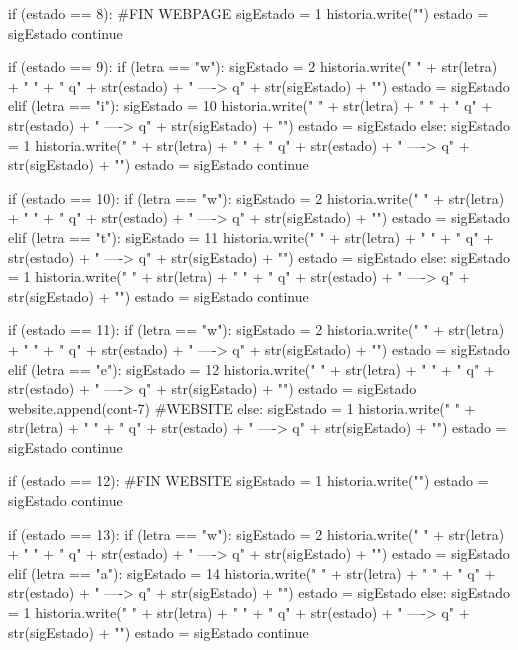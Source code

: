 \documentclass{article}
\begin{document}
\begin{python}
				if (estado == 8): #FIN WEBPAGE                   
					sigEstado = 1
					historia.write("\n")
					estado = sigEstado
				continue
			
				if (estado == 9):
					if (letra == "w"):
						sigEstado = 2
						historia.write(" { " + str(letra) + " } " + "  q" + str(estado) + "  ---->  q" + str(sigEstado) + "\n")
						estado = sigEstado              
					elif (letra == "i"):
						sigEstado = 10
						historia.write(" { " + str(letra) + " } " + "  q" + str(estado) + "  ---->  q" + str(sigEstado) + "\n")
						estado = sigEstado            
					else:
						sigEstado = 1
						historia.write(" { " + str(letra) + " } " + "  q" + str(estado) + "  ---->  q" + str(sigEstado) + "\n")
						estado = sigEstado
					continue
			
				if (estado == 10):
					if (letra == "w"):
						sigEstado = 2    
						historia.write(" { " + str(letra) + " } " + "  q" + str(estado) + "  ---->  q" + str(sigEstado) + "\n")
						estado = sigEstado       
					elif (letra == "t"):
						sigEstado = 11
						historia.write(" { " + str(letra) + " } " + "  q" + str(estado) + "  ---->  q" + str(sigEstado) + "\n")
						estado = sigEstado            
					else:
						sigEstado = 1
						historia.write(" { " + str(letra) + " } " + "  q" + str(estado) + "  ---->  q" + str(sigEstado) + "\n")
						estado = sigEstado
					continue
			
				if (estado == 11):
					if (letra == "w"):
						sigEstado = 2    
						historia.write(" { " + str(letra) + " } " + "  q" + str(estado) + "  ---->  q" + str(sigEstado) + "\n")
						estado = sigEstado       
					elif (letra == "e"):
						sigEstado = 12
						historia.write(" { " + str(letra) + " } " + "  q" + str(estado) + "  ---->  q" + str(sigEstado) + "\n")
						estado = sigEstado
						website.append(cont-7) #WEBSITE               
					else:
						sigEstado = 1     
						historia.write(" { " + str(letra) + " } " + "  q" + str(estado) + "  ---->  q" + str(sigEstado) + "\n")
						estado = sigEstado      
					continue
			
				if (estado == 12): #FIN WEBSITE
					sigEstado = 1
					historia.write("\n")
					estado = sigEstado
				continue
					
				if (estado == 13):
					if (letra == "w"):
						sigEstado = 2   
						historia.write(" { " + str(letra) + " } " + "  q" + str(estado) + "  ---->  q" + str(sigEstado) + "\n")
						estado = sigEstado            
					elif (letra == "a"):
						sigEstado = 14    
						historia.write(" { " + str(letra) + " } " + "  q" + str(estado) + "  ---->  q" + str(sigEstado) + "\n")
						estado = sigEstado         
					else:
						sigEstado = 1
						historia.write(" { " + str(letra) + " } " + "  q" + str(estado) + "  ---->  q" + str(sigEstado) + "\n")
						estado = sigEstado
					continue
			

\end{python}
\end{document}
